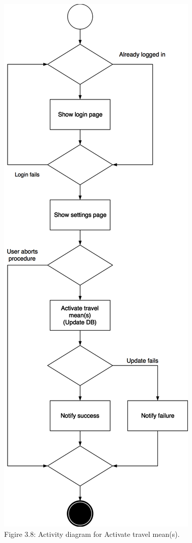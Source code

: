 \documentclass{article}
\begin{document}
	\begin{center}
		\includegraphics[scale=0.25]{img/diagrams/activate_travel_mean_ad.png} \\ \bigskip
		Figire 3.8: Activity diagram for Activate travel mean(s).
	\end{center}
	\newpage
\end{document}
